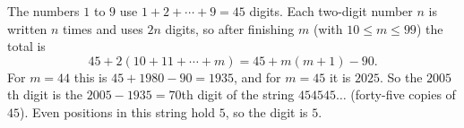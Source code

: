 The numbers $1$ to $9$ use $1+2+\cdots+9=45$ digits. Each two-digit number $n$ is written $n$ times and uses $2n$ digits, so after finishing $m$ (with $10\le m\le99$) the total is
\[45+2(10+11+\cdots+m)=45+m(m+1)-90.\]
For $m=44$ this is $45+1980-90=1935$, and for $m=45$ it is $2025$. So the $2005$th digit is the $2005-1935=70$th digit of the string $454545\ldots$ (forty-five copies of $45$). Even positions in this string hold $5$, so the digit is $\boxed{5}$.
